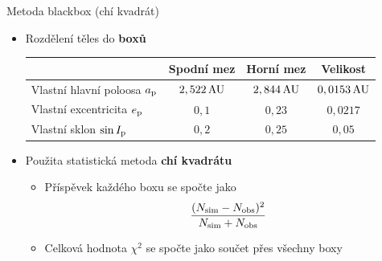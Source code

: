 \documentclass[xcolor=dvipsnames]{beamer}
\begin{document}
\begin{frame}[t]{\secname}{Metoda blackbox (chí kvadrát)}
	\begin{itemize}
		\item Rozdělení těles do \textbf{boxů}

		\begin{table}
		\centering
{\footnotesize
			\begin{tabularx}{0.9\textwidth}{|X||c|c|c|}
				\hline
				& Spodní mez & Horní mez & Velikost  \\
				\hline \hline
				Vlastní hlavní poloosa $a_{\rm p}$ & $2,522\,{\rm AU}$ & $2,844\,{\rm AU}$ & $0,0153\,{\rm AU}$ \\
				\hline
				Vlastní excentricita $e_{\rm p}$ & $0,1$ & $0,23$ & $0,0217$ \\
				\hline
				Vlastní sklon $\sin I_{\rm p}$ & $0,2$ & $0,25$ & $0,05$ \\
				\hline
			\end{tabularx}
}
		\end{table}

		\item Použita statistická metoda \textbf{chí kvadrátu}
		\begin{itemize}
			\item Příspěvek každého boxu se spočte jako
			\begin{align*}
				\frac{(N_{\rm sim}-N_{\rm obs})^2}{N_{\rm sim}+N_{\rm obs}}
			\end{align*}
			\item Celková hodnota $\chi^2$ se spočte jako součet přes všechny boxy	
		\end{itemize}
	\end{itemize}
\end{frame}
\end{document}
